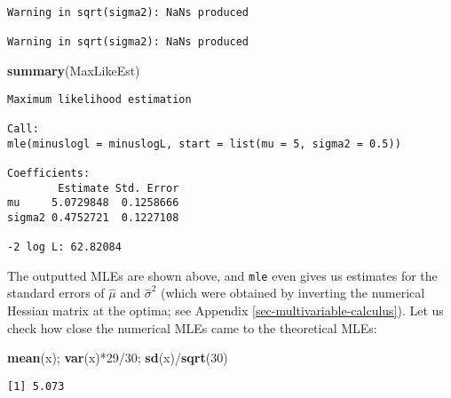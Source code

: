 \documentclass[]{book}
\newenvironment{Shaded}{\begin{snugshade}}{\end{snugshade}}
\newcommand{\KeywordTok}[1]{\textcolor[rgb]{0.13,0.29,0.53}{\textbf{{#1}}}}
\newcommand{\DataTypeTok}[1]{\textcolor[rgb]{0.13,0.29,0.53}{{#1}}}
\newcommand{\DecValTok}[1]{\textcolor[rgb]{0.00,0.00,0.81}{{#1}}}
\newcommand{\FloatTok}[1]{\textcolor[rgb]{0.00,0.00,0.81}{{#1}}}
\newcommand{\StringTok}[1]{\textcolor[rgb]{0.31,0.60,0.02}{{#1}}}
\newcommand{\NormalTok}[1]{{#1}}
\numberwithin{equation}{chapter}
\numberwithin{figure}{chapter}
\theoremstyle{plain}
\theoremstyle{definition}
\theoremstyle{remark}
\theoremstyle{definition}
\theoremstyle{definition}
\theoremstyle{remark}
\begin{document}
\begin{Shaded}
\end{Shaded}

\begin{verbatim}
Warning in sqrt(sigma2): NaNs produced

Warning in sqrt(sigma2): NaNs produced
\end{verbatim}

\begin{Shaded}
\begin{Highlighting}[]
\KeywordTok{summary}\NormalTok{(MaxLikeEst)}
\end{Highlighting}
\end{Shaded}

\begin{verbatim}
Maximum likelihood estimation

Call:
mle(minuslogl = minuslogL, start = list(mu = 5, sigma2 = 0.5))

Coefficients:
        Estimate Std. Error
mu     5.0729848  0.1258666
sigma2 0.4752721  0.1227108

-2 log L: 62.82084 
\end{verbatim}

The outputted MLEs are shown above, and \texttt{mle} even gives us
estimates for the standard errors of \(\hat{\mu}\) and
\(\hat{\sigma}^{2}\) (which were obtained by inverting the numerical
Hessian matrix at the optima; see Appendix
\ref{sec-multivariable-calculus}). Let us check how close the numerical
MLEs came to the theoretical MLEs:

\begin{Shaded}
\begin{Highlighting}[]
\KeywordTok{mean}\NormalTok{(x); }\KeywordTok{var}\NormalTok{(x)*}\DecValTok{29}\NormalTok{/}\DecValTok{30}\NormalTok{; }\KeywordTok{sd}\NormalTok{(x)/}\KeywordTok{sqrt}\NormalTok{(}\DecValTok{30}\NormalTok{)}
\end{Highlighting}
\end{Shaded}

\begin{verbatim}
[1] 5.073
\end{verbatim}
\end{document}
